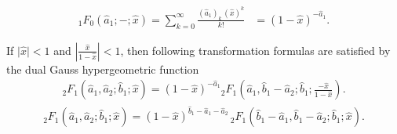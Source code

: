 \documentclass[10pt,a4paper]{amsart}
\begin{document}
\begin{align}
{}_1F_0 (\widehat{a}_1; -;  \widehat{x})  = \sum_{k = 0}^{\infty} \frac{(\widehat{a}_1)_k \, (\widehat{x})^k}{k !} & = (1 - \widehat{x})^{-\widehat{a}_1}. \label{5.1}
\end{align}

\begin{theorem}
	If $\vert \widehat{x} \vert < 1$ and $\left\vert\frac{\widehat{x}}{1 - \widehat{x}}\right \vert < 1$, then following transformation formulas are satisfied by the dual Gauss hypergeometric function
	\begin{align}
		{}_2F_1 (\widehat{a}_1, \widehat{a}_2; \widehat{b}_1; \widehat{x}) = (1 - \widehat{x})^{-\widehat{a}_1} {}_2F_1 \left(\widehat{a}_1, \widehat{b}_1 - \widehat{a}_2; \widehat{b}_1; \frac{-\widehat{x}}{1 - \widehat{x}}\right).\label{5.31}
	\end{align}
\begin{align}
	{}_2F_1 (\widehat{a}_1, \widehat{a}_2; \widehat{b}_1; \widehat{x}) = (1 - \widehat{x})^{\widehat{b}_1 - \widehat{a}_1 - \widehat{a}_2} \, {}_2F_1 (\widehat{b}_1 - \widehat{a}_1, \widehat{b}_1 - \widehat{a}_2; \widehat{b}_1; \widehat{x}).\label{2.5.4}
\end{align}
\end{theorem}
\end{document}
